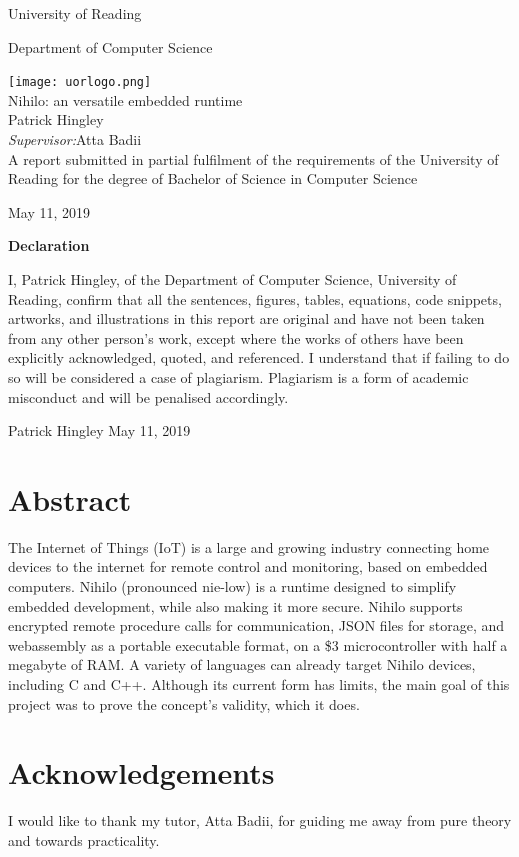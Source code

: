 \documentclass{article}
\begin{document}
\begin{center}
\huge{University of Reading

Department of Computer Science}

\texttt{[image: uorlogo.png]}\\[10mm]

\Huge{Nihilo: an versatile embedded runtime}\\[10mm]
 
\huge{Patrick Hingley}\\[10mm]

\Large{\emph{Supervisor:}Atta Badii}\\[10mm]

A report submitted in partial fulfilment of the requirements of
the University of Reading for the degree of
Bachelor of Science in Computer Science

May 11, 2019
\end{center}
\pagebreak
\large{\textbf{Declaration}}

I, Patrick Hingley, of the Department of Computer Science, University of Reading,
confirm that all the sentences, figures, tables, equations, code snippets, artworks, and illustrations in this report are original and have not been taken from any other person’s work,
except where the works of others have been explicitly acknowledged, quoted, and referenced.
I understand that if failing to do so will be considered a case of plagiarism. Plagiarism is a
form of academic misconduct and will be penalised accordingly.

Patrick Hingley
May 11, 2019

\pagebreak
\section{Abstract}
The Internet of Things (IoT) is a large and growing industry connecting home devices to the internet for remote control and monitoring, based on embedded computers. Nihilo (pronounced nie-low) is a runtime designed to simplify embedded development, while also making it more secure. Nihilo supports encrypted remote procedure calls for communication, JSON files for storage, and webassembly as a portable executable format, on a \$3 microcontroller with half a megabyte of RAM. A variety of languages can already target Nihilo devices, including C and C++. Although its current form has limits, the main goal of this project was to prove the concept's validity, which it does.

\section{Acknowledgements}
I would like to thank my tutor, Atta Badii, for guiding me away from pure theory and towards practicality.
\end{document}
